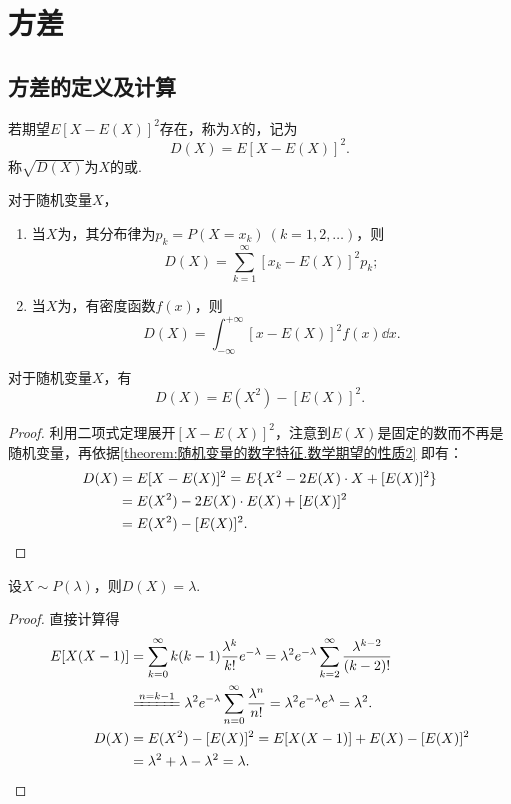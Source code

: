 \section{方差}
\subsection{方差的定义及计算}
\begin{definition}
若期望\(E[X-E(X)]^2\)存在，称为\(X\)的，记为\[
D(X) = E[X-E(X)]^2.
\]称\(\sqrt{D(X)}\)为\(X\)的或.
\end{definition}

\begin{theorem}
对于随机变量\(X\)，
\begin{enumerate}
\item 当\(X\)为，其分布律为\(p_k = P(X=x_k)\ (k=1,2,\dotsc)\)，则\[
D(X) = \sum_{k=1}^\infty [x_k - E(X)]^2 p_k;
\]
\item 当\(X\)为，有密度函数\(f(x)\)，则\[
D(X) = \int_{-\infty}^{+\infty} [x - E(X)]^2 f(x) \dd{x}.
\]
\end{enumerate}
\end{theorem}

\begin{corollary}\label{theorem:随机变量的数字特征.常用的方差的计算式}
对于随机变量\(X\)，有\begin{equation}
D(X) = E(X^2) - [E(X)]^2.
\end{equation}
\begin{proof}
利用二项式定理展开\([X-E(X)]^2\)，注意到\(E(X)\)是固定的数而不再是随机变量，再依据\cref{theorem:随机变量的数字特征.数学期望的性质2} 即有：
\begin{align*}
D(X) &= E[X-E(X)]^2
= E\{X^2 - 2E(X) \cdot X + [E(X)]^2\} \\
&= E(X^2) - 2E(X) \cdot E(X) + [E(X)]^2 \\
&= E(X^2) - [E(X)]^2.
\qedhere
\end{align*}
\end{proof}
\end{corollary}

\begin{theorem}
设\(X \sim P(\lambda)\)，则\(D(X) = \lambda\).
\begin{proof}
直接计算得
\begin{align*}
E[X(X-1)]
&= \sum_{k=0}^\infty {k(k-1) \frac{\lambda^k}{k!} e^{-\lambda}}
= \lambda^2 e^{-\lambda} \sum_{k=2}^\infty {\frac{\lambda^{k-2}}{(k-2)!}} \\
&\xlongequal{n=k-1} \lambda^2 e^{-\lambda} \sum_{n=0}^\infty {\frac{\lambda^n}{n!}}
= \lambda^2 e^{-\lambda} e^\lambda = \lambda^2. \\
D(X)
&= E(X^2) - [E(X)]^2
= E[X(X-1)] + E(X) - [E(X)]^2 \\
&= \lambda^2 + \lambda - \lambda^2 = \lambda.
\qedhere
\end{align*}
\end{proof}
\end{theorem}

